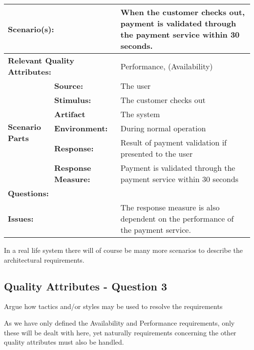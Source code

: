 \begin{table}[H]
\begin{center}
\begin{tabular}{|p{0.3cm}|p{2.5cm}|p{8cm}|}
  \hline
  \multicolumn{2}{|p{3cm}|}{\bfseries Scenario(s):} & When the customer checks out, payment is validated through the payment service within 30 seconds. \\
  \hline
  \multicolumn{2}{|p{3cm}|}{\bfseries Relevant Quality Attributes:} & Performance, (Availability) \\
  \hline
  \multirow{6}{*}{\begin{sideways}{\bfseries Scenario Parts}\end{sideways}}
  & {\bfseries Source:} & The user \\
  \cline{2-3}
  & {\bfseries Stimulus:} & The customer checks out \\
  \cline{2-3}
  & {\bfseries Artifact} & The system \\
  \cline{2-3}
  & {\bfseries Environment:} & During normal operation \\
  \cline{2-3}
  & {\bfseries Response:} & Result of payment validation if presented to the user \\
  \cline{2-3}
  & {\bfseries Response Measure:} & Payment is validated through the payment service within 30 seconds \\
  \hline
  \multicolumn{2}{|p{3cm}|}{\bfseries Questions:} & \\
  \hline
  \multicolumn{2}{|p{3cm}|}{\bfseries Issues:} & The response measure is also dependent on the performance of the payment service. \\
  \hline
\end{tabular}
\end{center}
\end{table}

In a real life system there will of course be many more scenarios to describe the architectural requirements.

\subsection{Quality Attributes - Question 3}
\label{sec:qa_q3}

\begin{question}
Argue how tactics and/or styles may be used to resolve the requirements
\end{question}

As we have only defined the Availability and Performance requirements, only these will be dealt with here, yet naturally requirements concerning the other quality attributes must also be handled.

